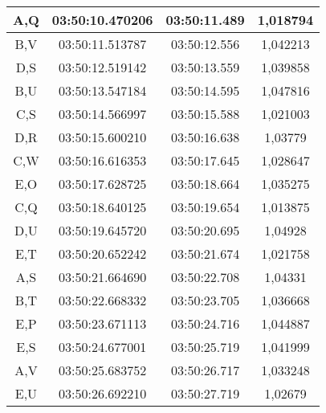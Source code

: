\begin{table}[!ht]
\begin{tabular}{|ccc|c|}
  \multicolumn{1}{|c|}{A,Q}  & \multicolumn{1}{c|}{03:50:10.470206} & 03:50:11.489       & 1,018794    \\ \hline
  \multicolumn{1}{|c|}{B,V}  & \multicolumn{1}{c|}{03:50:11.513787} & 03:50:12.556       & 1,042213    \\ \hline
  \multicolumn{1}{|c|}{D,S}  & \multicolumn{1}{c|}{03:50:12.519142} & 03:50:13.559       & 1,039858    \\ \hline
  \multicolumn{1}{|c|}{B,U}  & \multicolumn{1}{c|}{03:50:13.547184} & 03:50:14.595       & 1,047816    \\ \hline
  \multicolumn{1}{|c|}{C,S}  & \multicolumn{1}{c|}{03:50:14.566997} & 03:50:15.588       & 1,021003    \\ \hline
  \multicolumn{1}{|c|}{D,R}  & \multicolumn{1}{c|}{03:50:15.600210} & 03:50:16.638       & 1,03779     \\ \hline
  \multicolumn{1}{|c|}{C,W}  & \multicolumn{1}{c|}{03:50:16.616353} & 03:50:17.645       & 1,028647    \\ \hline
  \multicolumn{1}{|c|}{E,O}  & \multicolumn{1}{c|}{03:50:17.628725} & 03:50:18.664       & 1,035275    \\ \hline
  \multicolumn{1}{|c|}{C,Q}  & \multicolumn{1}{c|}{03:50:18.640125} & 03:50:19.654       & 1,013875    \\ \hline
  \multicolumn{1}{|c|}{D,U}  & \multicolumn{1}{c|}{03:50:19.645720} & 03:50:20.695       & 1,04928     \\ \hline
  \multicolumn{1}{|c|}{E,T}  & \multicolumn{1}{c|}{03:50:20.652242} & 03:50:21.674       & 1,021758    \\ \hline
  \multicolumn{1}{|c|}{A,S}  & \multicolumn{1}{c|}{03:50:21.664690} & 03:50:22.708       & 1,04331     \\ \hline
  \multicolumn{1}{|c|}{B,T}  & \multicolumn{1}{c|}{03:50:22.668332} & 03:50:23.705       & 1,036668    \\ \hline
  \multicolumn{1}{|c|}{E,P}  & \multicolumn{1}{c|}{03:50:23.671113} & 03:50:24.716       & 1,044887    \\ \hline
  \multicolumn{1}{|c|}{E,S}  & \multicolumn{1}{c|}{03:50:24.677001} & 03:50:25.719       & 1,041999    \\ \hline
  \multicolumn{1}{|c|}{A,V}  & \multicolumn{1}{c|}{03:50:25.683752} & 03:50:26.717       & 1,033248    \\ \hline
  \multicolumn{1}{|c|}{E,U}  & \multicolumn{1}{c|}{03:50:26.692210} & 03:50:27.719       & 1,02679     \\ \hline

\end{tabular}
\end{table}
